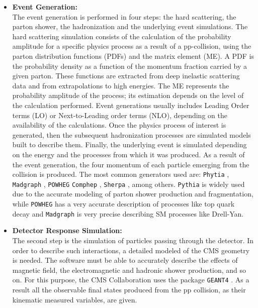 \begin{itemize}
 \item \textbf{Event Generation:} \\
 The event generation is performed in four steps: the hard scattering, 
 the parton shower, the hadronization and the underlying event simulations.
 The hard scattering simulation consists of the calculation of the 
 probability amplitude for a specific physics process as a result of a pp-collision, using the 
 parton distribution functions (PDFs) and the matrix element (ME). A PDF is
 the probability density as a function of the momentum fraction carried 
 by a given parton. These functions are extracted from deep
 inelastic scattering data and from extrapolations to high energies. The ME 
 represents the probability amplitude of the process; its estimation
 depends on the level of the calculation performed. Event generations 
 usually includes Leading Order terms (LO) or 
 Next-to-Leading order terms (NLO), depending on the 
 availability of the calculations. Once the physics process of interest 
 is generated, then the subsequent hadronization processes are simulated
 models built to describe them. Finally, the underlying event is simulated
 depending on the energy and the processes from which it was produced. As a 
 result of the event generation, the four momentum of each particle
 emerging from the collision is produced. The most common generators used 
 are: \texttt{Phytia} \cite{bib:pythia}, \texttt{Madgraph} \cite{bib:madgraph}, 
 \texttt{POWHEG} \cite{bib:Powheg1,bib:Powheg2} 
 \texttt{Comphep} \cite{bib:comphep}, \texttt{Sherpa} \cite{bib:sherpa}, among 
 others. \texttt{Pythia} is widely used due to the accurate modeling of parton shower production
and fragmentation, while \texttt{POWHEG} has a very accurate description of processes
like top quark decay and \texttt{Madgraph} is very precise describing SM processes like Drell-Yan. \\


 
  \item \textbf{Detector Response Simulation:}\\
  The second step is the simulation of particles passing through the 
  detector. In order to describe such interactions, a detailed 
  modeled of the CMS geometry is needed. The 
  software must be able to accurately describe the effects of magnetic 
  field, the electromagnetic and hadronic shower production, and so on. For 
  this purpose, the CMS Collaboration uses the package 
  \texttt{GEANT4} \cite{bib:geant4,bib:FullSim}. As a result
  all the observable final states produced from the pp collision, as their 
  kinematic measured variables, are given.\\
\end{itemize}

